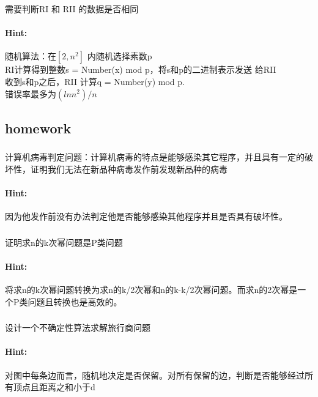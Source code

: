 \documentclass{article}
\begin{document}
 \subsubsection{}需要判断RI 和 RII 的数据是否相同
\paragraph{Hint:} 随机算法：在$[2, n^2]$ 内随机选择素数p\\
RI计算得到整数s = Number(x) mod p，将s和p的二进制表示发送
给RII\\
收到s和p之后，RII 计算q = Number(y) mod p.\\
错误率最多为$(ln n^2)/n$ 


      \subsection{homework}
     \subsubsection{}计算机病毒判定问题：计算机病毒的特点是能够感染其它程序，并且具有一定的破坏性，证明我们无法在新品种病毒发作前发现新品种的病毒
     \paragraph{Hint:}因为他发作前没有办法判定他是否能够感染其他程序并且是否具有破坏性。
     
     \subsubsection{}证明求n的k次幂问题是P类问题
     \paragraph{Hint:}将求n的k次幂问题转换为求n的k/2次幂和n的k-k/2次幂问题。而求n的2次幂是一个P类问题且转换也是高效的。
     
     \subsubsection{}设计一个不确定性算法求解旅行商问题
     \paragraph{Hint:}对图中每条边而言，随机地决定是否保留。对所有保留的边，判断是否能够经过所有顶点且距离之和小于d
     
     
     
\end{document}
